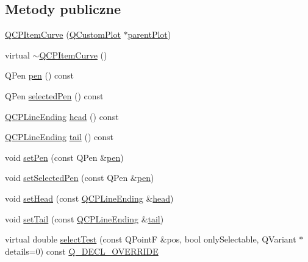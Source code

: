 \subsection*{Metody publiczne}
\begin{DoxyCompactItemize}
\item 
\hyperlink{class_q_c_p_item_curve_ac9b7508bb5c8827e1a7a6199f8c82bec}{Q\+C\+P\+Item\+Curve} (\hyperlink{class_q_custom_plot}{Q\+Custom\+Plot} $\ast$\hyperlink{class_q_c_p_layerable_ab7e0e94461566093d36ffc0f5312b109}{parent\+Plot})
\item 
virtual \hyperlink{class_q_c_p_item_curve_ae36f20fd5deff2f1443a7c53eaa95c81}{$\sim$\+Q\+C\+P\+Item\+Curve} ()
\item 
Q\+Pen \hyperlink{class_q_c_p_item_curve_abc6321e55a9ba1a0c7df407843dfa252}{pen} () const 
\item 
Q\+Pen \hyperlink{class_q_c_p_item_curve_abd8b8be5b13bc4dafec4c1758c281336}{selected\+Pen} () const 
\item 
\hyperlink{class_q_c_p_line_ending}{Q\+C\+P\+Line\+Ending} \hyperlink{class_q_c_p_item_curve_afc067f0d1e60cd04812f2c2c7fdf36c3}{head} () const 
\item 
\hyperlink{class_q_c_p_line_ending}{Q\+C\+P\+Line\+Ending} \hyperlink{class_q_c_p_item_curve_a9adddfcc5275be0cf27e3c0c31c37c1a}{tail} () const 
\item 
void \hyperlink{class_q_c_p_item_curve_a034be908440aec785c34b92843461221}{set\+Pen} (const Q\+Pen \&\hyperlink{class_q_c_p_item_curve_abc6321e55a9ba1a0c7df407843dfa252}{pen})
\item 
void \hyperlink{class_q_c_p_item_curve_a375b917669f868c5a106bf2f1ab7c26d}{set\+Selected\+Pen} (const Q\+Pen \&\hyperlink{class_q_c_p_item_curve_abc6321e55a9ba1a0c7df407843dfa252}{pen})
\item 
void \hyperlink{class_q_c_p_item_curve_a08a30d9cdd63995deea3d9e20430676f}{set\+Head} (const \hyperlink{class_q_c_p_line_ending}{Q\+C\+P\+Line\+Ending} \&\hyperlink{class_q_c_p_item_curve_afc067f0d1e60cd04812f2c2c7fdf36c3}{head})
\item 
void \hyperlink{class_q_c_p_item_curve_ac3488d8b1a6489c845dc5bff3ef71124}{set\+Tail} (const \hyperlink{class_q_c_p_line_ending}{Q\+C\+P\+Line\+Ending} \&\hyperlink{class_q_c_p_item_curve_a9adddfcc5275be0cf27e3c0c31c37c1a}{tail})
\item 
virtual double \hyperlink{class_q_c_p_item_curve_a718fa40140a43c8afbd41a3d85c92d72}{select\+Test} (const Q\+PointF \&pos, bool only\+Selectable, Q\+Variant $\ast$details=0) const \hyperlink{qcustomplot_8hh_a42cc5eaeb25b85f8b52d2a4b94c56f55}{Q\+\_\+\+D\+E\+C\+L\+\_\+\+O\+V\+E\+R\+R\+I\+DE}
\end{DoxyCompactItemize}
